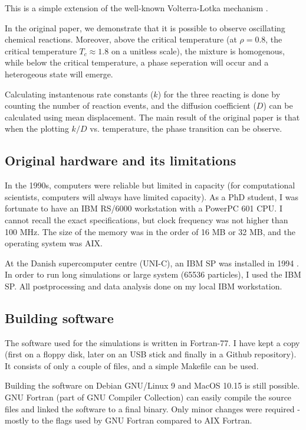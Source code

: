 This is a simple extension of the well-known Volterra-Lotka mechanism
\supercite{Lotka:1910} \supercite{Lotka:1920}.

In the original paper, we demonstrate that it is possible to observe oscillating
chemical reactions. Moreover, above the critical temperature (at $\rho = 0.8$,
the critical temperature $T_c \approx 1.8$ on a unitless scale), the
mixture is homogenous, while below the critical temperature,
a phase seperation will occur and a heterogeous state will emerge.

Calculating instantenous rate constants ($k$) for the three reacting is done by
counting the number of reaction events, and the diffusion coefficient ($D$)
can be calculated using mean displacement. The main result of the original
paper is that when the plotting $k/D$ vs. temperature, the phase transition can
be observe.

\subsection{Original hardware and its limitations}

In the 1990s, computers were reliable but limited in capacity (for computational scientists,
computers will always have limited capacity). As a PhD student, I was fortunate to
have an IBM RS/6000 workstation with a PowerPC 601 CPU. I cannot recall the exact specifications,
but clock frequency was not higher than 100 MHz. The size of the memory was in the order
of 16 MB or 32 MB, and the operating system was AIX.

At the Danish supercomputer centre (UNI-C), an IBM SP was installed in 1994 \supercite{Hultberg:1999}.
In order to run long simulations or large system (65536 particles), I used the IBM SP.
All postprocessing and data analysis done on my local IBM workstation.

\subsection{Building software}

The software used for the simulations is written in Fortran-77. I have kept a copy (first
on a floppy disk, later on an USB stick and finally in a Github repository). It consists of
only a couple of files, and a simple Makefile can be used.

Building the software on Debian GNU/Linux 9 and MacOS 10.15 is still possible. GNU Fortran
(part of GNU Compiler Collection) can easily compile the source files and linked
the software to a final binary. Only minor changes were required - mostly to the
flags used by GNU Fortran compared to AIX Fortran.

